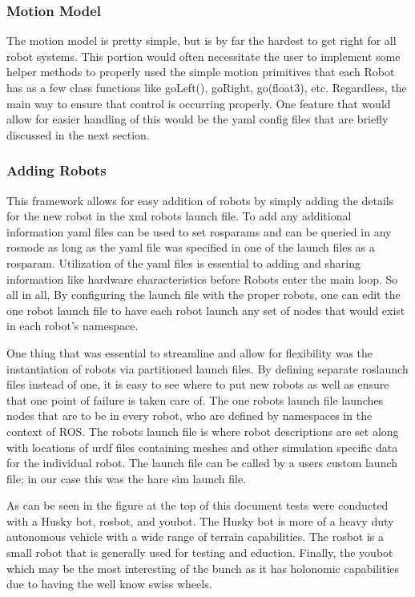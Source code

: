 \subsubsection{Motion Model}

The motion model is pretty simple, but is by far the hardest to get right for all robot systems. This
portion would often necessitate the user to implement some helper methods to properly used the simple
motion primitives that each Robot has as a few class functions like goLeft(), goRight, go(float3), etc.
Regardless, the main way to ensure that control is occurring properly. One feature that would allow
for easier handling of this would be the yaml config files that are briefly discussed in the next section.

\subsubsection{Adding Robots}

This framework allows for easy addition of robots by simply
adding the details for the new robot in the xml robots launch file. To add any additional information
yaml files can be used to set rosparams and can be queried in any rosnode as long as the yaml file
was specified in one of the launch files as a rosparam. Utilization of the yaml files is essential
to adding and sharing information like hardware characteristics before Robots enter the main loop. So all in all, By configuring
the launch file with the proper robots, one can edit the one robot launch file to have each robot launch
any set of nodes that would exist in each robot's namespace.

One thing that was essential to streamline and allow for flexibility was the instantiation of robots via partitioned
launch files. By defining separate roslaunch files instead of one, it is easy to see where to
put new robots as well as ensure that one point of failure is taken care of.
The one robots launch file launches nodes that are to be in every robot,
who are defined by namespaces in the context of ROS. The robots launch file is where robot descriptions
are set along with locations of urdf files containing meshes and other simulation specific
data for the individual robot. The launch file can be called by a users custom
launch file; in our case this was the hare sim launch file.

As can be seen in the figure at the top of this document tests were conducted with a Husky bot, rosbot, and youbot. The Husky bot is more of a heavy duty autonomous vehicle with a wide range of terrain capabilities. The rosbot is a
small robot that is generally used for testing and eduction. Finally, the youbot which may be the most
interesting of the bunch as it has holonomic capabilities due to having the well know swiss wheels.

